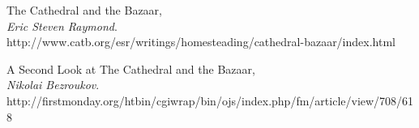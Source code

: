 \documentclass[11pt]{scrartcl}
\begin{document}
\begin{thebibliography}{9}

		The Cathedral and the Bazaar,\\
		\emph{Eric Steven Raymond}.\\
		http://www.catb.org/esr/writings/homesteading/cathedral-bazaar/index.html
	
		A Second Look at The Cathedral and the Bazaar,\\
		\emph{Nikolai Bezroukov}.\\
		http://firstmonday.org/htbin/cgiwrap/bin/ojs/index.php/fm/article/view/708/618	
\end{thebibliography}
\end{document}
